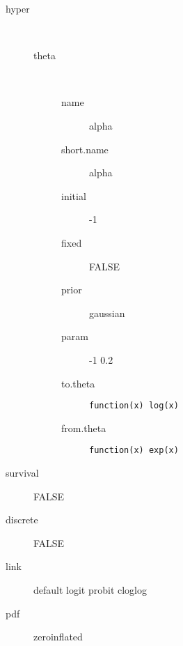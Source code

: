\begin{description}
	\item[hyper]\ 
	 \begin{description}
	 	\item[theta]\ 
	 	 \begin{description}
	 	 	\item[name] alpha
	 	 	\item[short.name] alpha
	 	 	\item[initial] -1
	 	 	\item[fixed] FALSE
	 	 	\item[prior] gaussian
	 	 	\item[param] -1 0.2
	 	 	\item[to.theta] \verb|function(x) log(x)|
	 	 	\item[from.theta] \verb|function(x) exp(x)|
	 	 \end{description}
	 \end{description}
	\item[survival] FALSE
	\item[discrete] FALSE
	\item[link] default logit probit cloglog
	\item[pdf] zeroinflated
\end{description}
